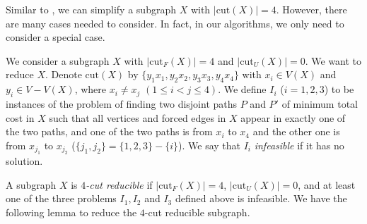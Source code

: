 \documentclass[runningheads]{llncs}
\begin{document}
Similar to , we can simplify a subgraph $X$ with $|\mathrm{cut}(X)|=4$. However, there are
many cases needed to consider. In fact, in our algorithms, we only need to consider a special case.

We consider a subgraph $X$ with $|\mathrm{cut}_F(X)|=4$ and $|\mathrm{cut}_U(X)|=0$.
We want to reduce $X$.
Denote $\mathrm{cut}(X)$ by $\{y_1x_1,y_2x_2,y_3x_3,y_4x_4\}$ with $x_i\in V(X)$ and $y_i\in V-V(X)$,
where $x_i\neq x_j$ $(1\leq i<j\leq 4)$.
We define $I_i$ ($i=1,2,3$) to be instances of the problem of finding two disjoint paths $P$ and $P'$ of minimum total cost in $X$ such that all vertices and forced edges in $X$  appear in exactly one of the two paths, and one of the two paths is from $x_i$ to $x_4$ and the other one is from $x_{j_1}$ to $x_{j_2}$ ($\{j_1,j_2\}=\{1,2,3\}-\{i\}$).
We say that $I_i$ \emph{infeasible} if it has no solution.

A subgraph $X$ is \emph{$4$-cut reducible} if $|\mathrm{cut}_F(X)|=4$, $|\mathrm{cut}_U(X)|=0$, and at least one of the three problems $I_1, I_2$ and $I_3$ defined above is infeasible.
We have the following lemma to reduce the $4$-cut reducible subgraph.
\end{document}
